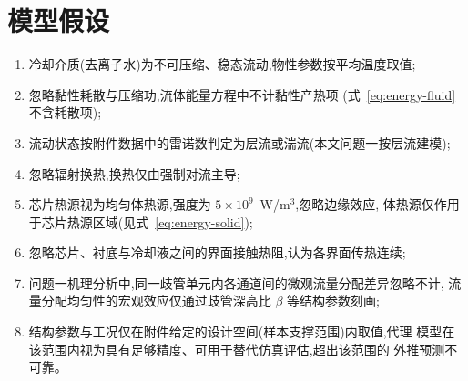 %
\section{模型假设}

\begin{enumerate}
  \item 冷却介质(去离子水)为不可压缩、稳态流动,物性参数按平均温度取值;
  \item 忽略黏性耗散与压缩功,流体能量方程中不计黏性产热项
        (式~\ref{eq:energy-fluid} 不含耗散项);
  \item 流动状态按附件数据中的雷诺数判定为层流或湍流(本文问题一按层流建模);
  \item 忽略辐射换热,换热仅由强制对流主导;
  \item 芯片热源视为均匀体热源,强度为 $5\times10^9$~W/m$^3$,忽略边缘效应,
        体热源仅作用于芯片热源区域(见式~\ref{eq:energy-solid});
  \item 忽略芯片、衬底与冷却液之间的界面接触热阻,认为各界面传热连续;
  \item 问题一机理分析中,同一歧管单元内各通道间的微观流量分配差异忽略不计,
        流量分配均匀性的宏观效应仅通过歧管深高比 $\beta$ 等结构参数刻画;
  \item 结构参数与工况仅在附件给定的设计空间(样本支撑范围)内取值,代理
        模型在该范围内视为具有足够精度、可用于替代仿真评估,超出该范围的
        外推预测不可靠。
\end{enumerate}

